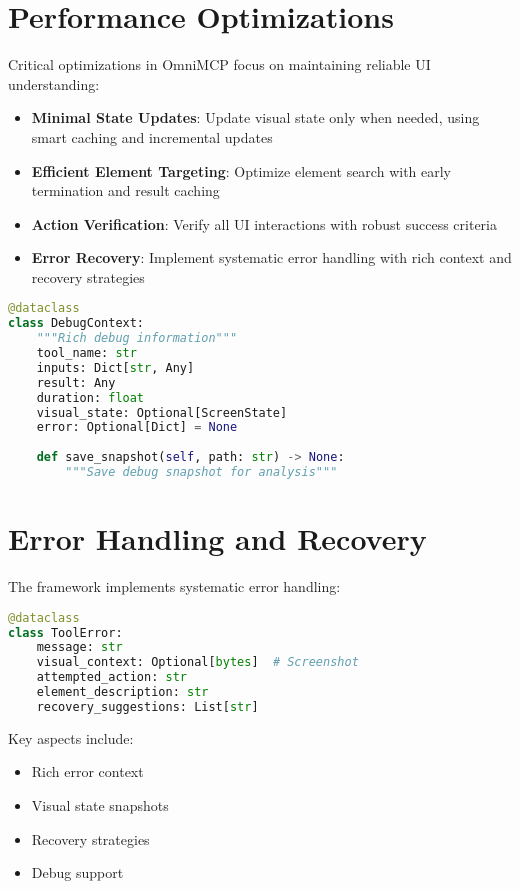 \documentclass{article}
\begin{document}
\section{Performance Optimizations}

Critical optimizations in OmniMCP focus on maintaining reliable UI understanding:

\begin{itemize}
    \item \textbf{Minimal State Updates}: Update visual state only when needed, using smart caching and incremental updates
    \item \textbf{Efficient Element Targeting}: Optimize element search with early termination and result caching
    \item \textbf{Action Verification}: Verify all UI interactions with robust success criteria
    \item \textbf{Error Recovery}: Implement systematic error handling with rich context and recovery strategies
\end{itemize}

\begin{lstlisting}[language=Python]
@dataclass
class DebugContext:
    """Rich debug information"""
    tool_name: str
    inputs: Dict[str, Any]
    result: Any
    duration: float
    visual_state: Optional[ScreenState]
    error: Optional[Dict] = None
    
    def save_snapshot(self, path: str) -> None:
        """Save debug snapshot for analysis"""
\end{lstlisting}

\section{Error Handling and Recovery}

The framework implements systematic error handling:

\begin{lstlisting}[language=Python]
@dataclass
class ToolError:
    message: str
    visual_context: Optional[bytes]  # Screenshot
    attempted_action: str
    element_description: str
    recovery_suggestions: List[str]
\end{lstlisting}

Key aspects include:
\begin{itemize}
    \item Rich error context
    \item Visual state snapshots
    \item Recovery strategies
    \item Debug support
\end{itemize}
\end{document}
